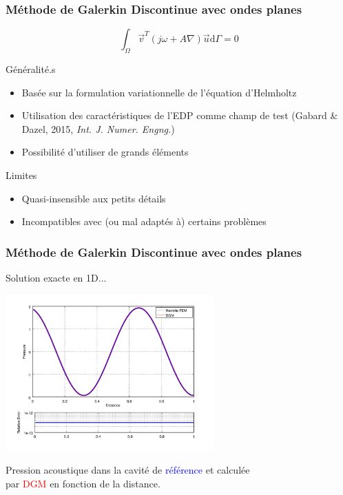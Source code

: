 \documentclass[10pt, compress]{beamer}
\begin{document}
\begin{frame}
	\frametitle{Méthode de Galerkin Discontinue avec ondes planes}

	$$\int_\Omega \vec{v}^T\left(j\omega + A\nabla\right)\vec{u}\mathrm{d}\Gamma = 0$$

	\begin{block}{Généralité.s}
		\begin{itemize}
			\item Basée sur la formulation variationnelle de l'équation d'Helmholtz
            \item Utilisation des caractéristiques de l'EDP comme champ de test (Gabard \& Dazel, 2015, \textit{Int. J.
                Numer. Engng.})
			\item Possibilité d'utiliser de grands éléments
		\end{itemize}
	\end{block}
	\begin{block}{Limites}
		\begin{itemize}
			\item Quasi-insensible aux petits détails
			\item Incompatibles avec (ou mal adaptés à) certains problèmes
		\end{itemize}
	\end{block}
\end{frame}

\begin{frame}[fragile]
	\frametitle{Méthode de Galerkin Discontinue avec ondes planes}
    \begin{figure}
        \vspace{-0.1\textwidth}
        \begin{tikzpicture}[>=stealth,scale=0.4,transform shape]
        
        \end{tikzpicture}
    \end{figure}

	\begin{block}{Solution exacte en 1D...}
		\begin{center}
		\includegraphics[width=0.6\textwidth]{comp_hermiteFEM_dgm.png}

        \footnotesize{Pression acoustique dans la cavité de \textcolor{blue}{référence} et calculée\\
        par \textcolor{red}{DGM} en fonction de la distance.}
		\end{center}
	\end{block}
\end{frame}
\end{document}
